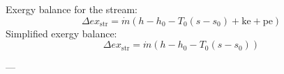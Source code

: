 Exergy balance for the stream:  
\[
\Delta ex_{\text{str}} = \dot{m} \left( h - h_0 - T_0 (s - s_0) + \text{ke} + \text{pe} \right)
\]  
Simplified exergy balance:  
\[
\Delta ex_{\text{str}} = \dot{m} \left( h - h_0 - T_0 (s - s_0) \right)
\]  

---